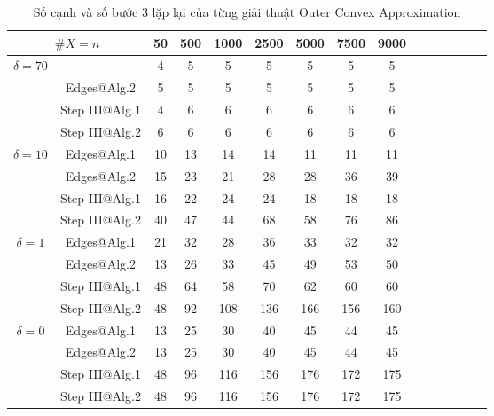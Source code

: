 \documentclass[12pt,a4paper,openany,oneside]{report}
\begin{document}
\begin{table}[ht]
	\begin{center}\renewcommand{\arraystretch}{1.2}\small
		\setlength\tabcolsep{0.05cm}
		\begin{tabular}{|c|c||c|c|c|c|c|c|c|c|c|c|c|c|c|}
			\hline
			\multicolumn {2}{|c||}{\footnotesize $\#X=n$}  & 50& 500& 1000& 2500& 5000& 7500& 9000\\ 
			\hline		
			\hline
			{ $\delta = 70$}
			
			& \text{Edges@Alg.1}  &  4& 5& 5& 5& 5& 5& 5 \\
			
			& Edges@Alg.2  &   5& 5& 5& 5& 5& 5& 5\\
			
			& Step III@Alg.1  &4 &6 &6 &6 &6 &6 &6  \\
			
			& Step III@Alg.2 &6 &6 &6 &6 &6 &6 &6  \\
			\hline
			{ $\delta = 10$}
			
			& Edges@Alg.1  & 10 & 13 &14& 14&11&11&11 \\
			
			& Edges@Alg.2 &15&23&21&28&28&36&39\\
			
			& Step III@Alg.1 &16&22&24&24&18&18&18 \\
			
			& Step III@Alg.2&40&47&44&68&58&76&86  \\
			\hline
			{ $\delta = 1$}
			
			& Edges@Alg.1  &21&32&28&36&33&32&32 \\
			
			& Edges@Alg.2 &13&26&33&45&49&53&50 \\
			
			& Step III@Alg.1 &48&64&58&70&62&60&60 \\
			
			& Step III@Alg.2&48&92&108&136&166&156&160   \\
			\hline
			{ $\delta = 0$}
			
			& Edges@Alg.1 &13&25&30&40&45&44&45 \\
			
			& Edges@Alg.2&13&25&30&40&45&44&45  \\
			
			& Step III@Alg.1 &48 &96 &116 &156 &176 &172 &175 \\
			
			& Step III@Alg.2&48 &96 &116 &156 &176 &172 &175   \\
			\hline
		\end{tabular}
		\caption{Số cạnh và số bước 3 lặp lại của từng giải thuật Outer Convex Approximation }
		\label{table02}
	\end{center}
\end{table} 
\end{document}
